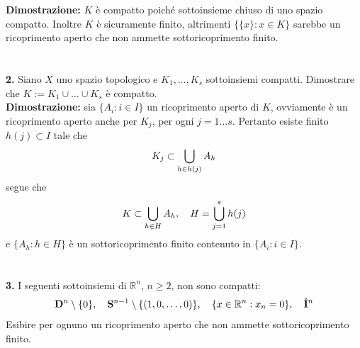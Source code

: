 \documentclass{article}
\begin{document}
\textbf{Dimostrazione:} $K$ è compatto poiché sottoinsieme chiuso di uno spazio compatto. Inoltre $K$ è sicuramente finito, altrimenti $\{ \{ x \} : x \in K \}$ sarebbe un ricoprimento aperto che non ammette sottoricoprimento finito. \\ \\ \\
\textbf{2.} Siano $X$ uno spazio topologico e $K_1, \dots, K_s$ sottoinsiemi compatti. Dimostrare che $K := K_1 \cup \dots \cup K_s$ è compatto. \\

\textbf{Dimostrazione:} sia $\{ A_i : i \in I \}$ un ricoprimento aperto di $K$, ovviamente è un ricoprimento aperto anche per $K_j$, per ogni $j = 1 \dots s$. Pertanto esiste finito $h(j) \subset I$ tale che
\begin{gather}
    K_j \subset \bigcup_{h \in h(j)} A_h \notag
\end{gather}
segue che
\begin{gather}
    K \subset \bigcup_{h \in H} A_h, \quad H = \bigcup_{j = 1}^s h(j) \notag
\end{gather}
e $\{ A_h : h \in H \}$ è un sottoricoprimento finito contenuto in $\{ A_i : i \in I \}$. \\ \\ \\
\textbf{3.} I seguenti sottoinsiemi di $\mathbb{R}^n$, $n \geq 2$, non sono compatti:
\begin{gather}
    \mathbf{D}^n \setminus \{ 0 \}, \quad \mathbf{S}^{n - 1} \setminus \{ (1, 0, \dots, 0) \}, \quad \{ x \in \mathbb{R}^n : x_n = 0 \}, \quad \mathring{\mathbf{I}}^n \notag
\end{gather}
Esibire per ognuno un ricoprimento aperto che non ammette sottoricoprimento finito. \\
\end{document}
